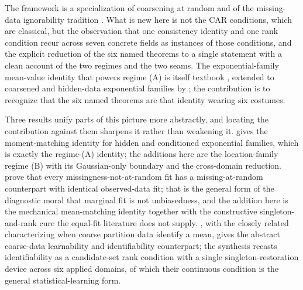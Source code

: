 The framework is a specialization of coarsening at random
\citep{heitjan1991ignorability,gill1997coarsening} and of the
missing-data ignorability tradition \citep{little2002statistical,tsiatis2006semiparametric}.
What is new here is not the CAR conditions, which are classical, but the
observation that one consistency identity and one rank condition recur
across seven concrete fields as instances of those conditions, and the
explicit reduction of the six named theorems to a single statement
with a clean account of the two regimes and the two seams. The
exponential-family mean-value identity that powers regime (A) is itself
textbook \citep{vandervaart1998asymptotic}, extended to coarsened and
hidden-data exponential families by \citet{domke2020moment}; the
contribution is to recognize that the six named theorems are that identity
wearing six costumes.

Three results unify parts of this picture more abstractly, and locating the
contribution against them sharpens it rather than weakening it.
\citet{domke2020moment} gives the moment-matching identity for hidden and
conditioned exponential families, which is exactly the regime-(A) identity;
the additions here are the location-family regime (B) with its Gaussian-only
boundary and the cross-domain reduction. \citet{molenberghs2008every} prove
that every missingness-not-at-random fit has a missing-at-random counterpart
with identical observed-data fit; that is the general form of the diagnostic
moral that marginal fit is not unbiasedness, and the addition here is the
mechanical mean-matching identity together with the constructive
singleton-and-rank cure the equal-fit literature does not supply.
\citet{fotakis2021efficient}, with the closely related
\citet{kalavasis2026mean} characterizing when coarse partition data
identify a mean, gives the abstract coarse-data learnability and
identifiability counterpart; the synthesis recasts identifiability as a
candidate-set rank condition with a single singleton-restoration device
across six applied domains, of which their continuous condition is the
general statistical-learning form.
